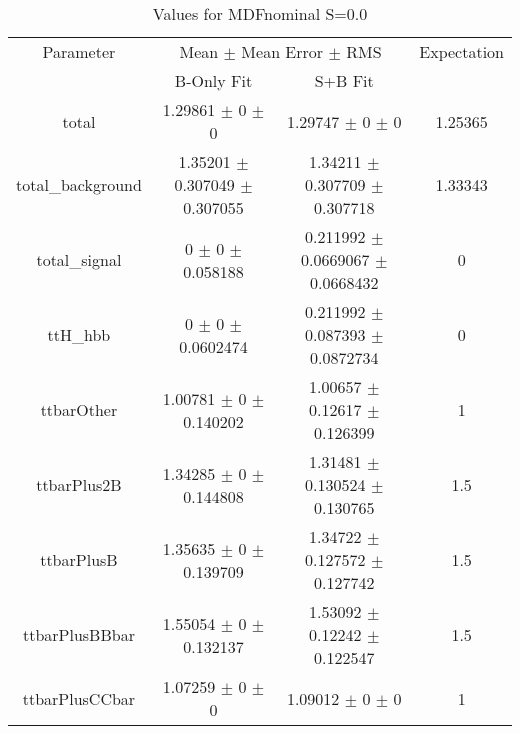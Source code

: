 \begin{table}
\centering
\caption{Values for MDFnominal S=0.0}
\begin{tabular}{cccc}
\toprule
Parameter & \multicolumn{2}{c}{Mean $\pm$ Mean Error $\pm$ RMS} & Expectation\\
 & B-Only Fit & S+B Fit & \\
\midrule
total & \num{1.29861} $\pm$ \num{0} $\pm$ \num{0} & \num{1.29747} $\pm$ \num{0} $\pm$ \num{0} & \num{1.25365}\\
total\_background & \num{1.35201} $\pm$ \num{0.307049} $\pm$ \num{0.307055} & \num{1.34211} $\pm$ \num{0.307709} $\pm$ \num{0.307718} & \num{1.33343}\\
total\_signal & \num{0} $\pm$ \num{0} $\pm$ \num{0.058188} & \num{0.211992} $\pm$ \num{0.0669067} $\pm$ \num{0.0668432} & \num{0}\\
ttH\_hbb & \num{0} $\pm$ \num{0} $\pm$ \num{0.0602474} & \num{0.211992} $\pm$ \num{0.087393} $\pm$ \num{0.0872734} & \num{0}\\
ttbarOther & \num{1.00781} $\pm$ \num{0} $\pm$ \num{0.140202} & \num{1.00657} $\pm$ \num{0.12617} $\pm$ \num{0.126399} & \num{1}\\
ttbarPlus2B & \num{1.34285} $\pm$ \num{0} $\pm$ \num{0.144808} & \num{1.31481} $\pm$ \num{0.130524} $\pm$ \num{0.130765} & \num{1.5}\\
ttbarPlusB & \num{1.35635} $\pm$ \num{0} $\pm$ \num{0.139709} & \num{1.34722} $\pm$ \num{0.127572} $\pm$ \num{0.127742} & \num{1.5}\\
ttbarPlusBBbar & \num{1.55054} $\pm$ \num{0} $\pm$ \num{0.132137} & \num{1.53092} $\pm$ \num{0.12242} $\pm$ \num{0.122547} & \num{1.5}\\
ttbarPlusCCbar & \num{1.07259} $\pm$ \num{0} $\pm$ \num{0} & \num{1.09012} $\pm$ \num{0} $\pm$ \num{0} & \num{1}\\
\bottomrule
\end{tabular}
\end{table}